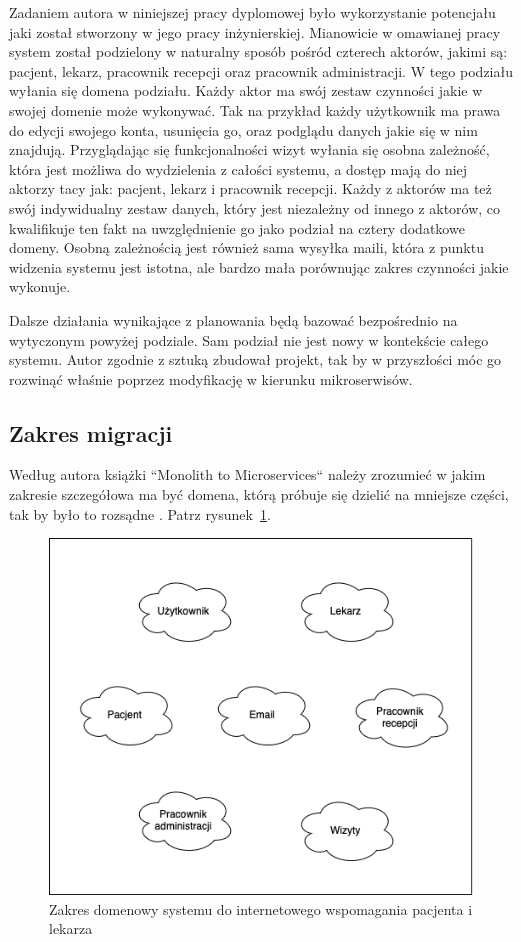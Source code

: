 \documentclass[12pt,oneside]{book}
\newcommand{\captionvspace}{\vspace{6pt}}
\begin{document}
    Zadaniem autora w niniejszej pracy dyplomowej było wykorzystanie potencjału jaki został stworzony w jego pracy inżynierskiej. Mianowicie w omawianej pracy system został podzielony w naturalny sposób pośród czterech aktorów, jakimi są: pacjent, lekarz, pracownik recepcji oraz pracownik administracji. W tego podziału wyłania się domena podziału. Każdy aktor ma swój zestaw czynności jakie w swojej domenie może wykonywać. Tak na przykład każdy użytkownik ma prawa do edycji swojego konta, usunięcia go, oraz podglądu danych jakie się w nim znajdują. Przyglądając się funkcjonalności wizyt wyłania się osobna zależność, która jest możliwa do wydzielenia z całości systemu, a dostęp mają do niej aktorzy tacy jak: pacjent, lekarz i pracownik recepcji. Każdy z aktorów ma też swój indywidualny zestaw danych, który jest niezależny od innego z aktorów, co kwalifikuje ten fakt na uwzględnienie go jako podział na cztery dodatkowe domeny. Osobną zależnością jest również sama wysyłka maili, która z punktu widzenia systemu jest istotna, ale bardzo mała porównując zakres czynności jakie wykonuje.

    Dalsze działania wynikające z planowania będą bazować bezpośrednio na wytyczonym powyżej podziale. Sam podział nie jest nowy w kontekście całego systemu. Autor zgodnie z sztuką zbudował projekt, tak by w przyszłości móc go rozwinąć właśnie poprzez modyfikację w kierunku mikroserwisów.

    \subsection{Zakres migracji}
    Według autora książki “Monolith to Microservices“ należy zrozumieć w jakim zakresie szczegółowa ma być domena, którą próbuje się dzielić na mniejsze części, tak by było to rozsądne \cite{monolith.to.microservices}. Patrz rysunek~\ref{fig:ddd-sdiwpil}.

    \begin{figure}[ht]
        \centering
        \includegraphics[width=\textwidth]{includes/images/ddd-sdiwpil.png}
        \captionvspace
        \caption{Zakres domenowy systemu do internetowego wspomagania pacjenta i lekarza}
        \label{fig:ddd-sdiwpil}
    \end{figure}
\end{document}
